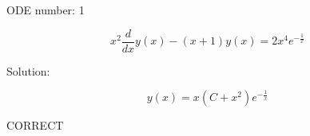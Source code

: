 \documentclass{article}
\begin{document}
        
ODE number: 1

$$
 x^{2} \frac{d}{d x} y{\left (x \right )} - \left(x + 1\right) y{\left (x \right )} = 2 x^{4} e^{- \frac{1}{x}} 
$$

Solution:

$$
 y{\left (x \right )} = x \left(C + x^{2}\right) e^{- \frac{1}{x}} 
$$

CORRECT
\end{document}

